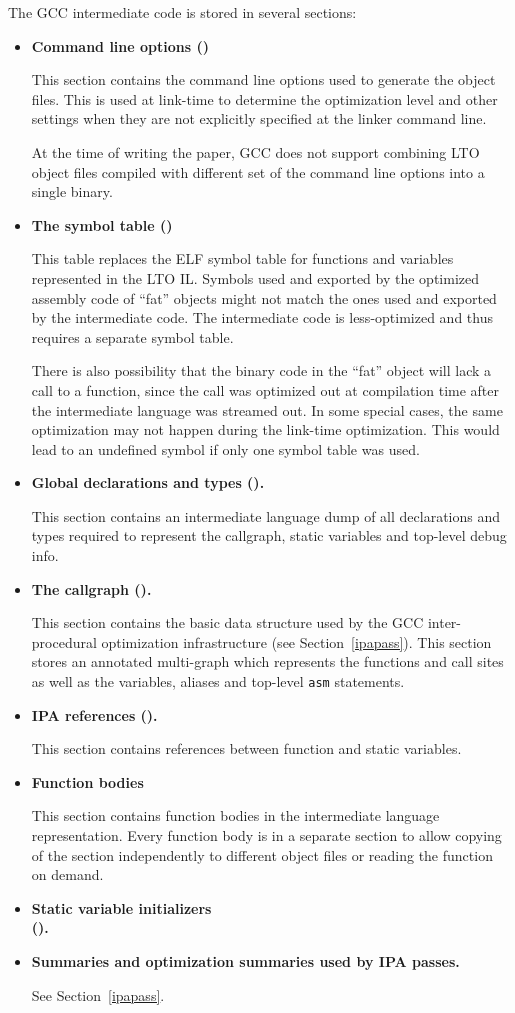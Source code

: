\documentclass[final]{ols}
\begin{document}
The GCC intermediate code is stored in several sections:
\begin{itemize}
 \item {\bf Command line options ()}

 This section
contains the command line options used to generate the object files.  This is
used at link-time to determine the optimization level and other settings when
they are not explicitly specified at the linker command line.

At the time of writing the paper, GCC  does not support combining LTO
object files compiled with different set of the command line options into
a single binary.

\item {\bf The symbol table ()}

This table replaces
the ELF symbol table for functions and variables represented in the LTO IL.
Symbols used and exported by the optimized assembly code of ``fat'' objects
might not match the ones used and exported by the intermediate code.  The
intermediate code is less-optimized and thus requires a separate symbol table.

There is also possibility that the binary code in the ``fat'' object will lack a call to a
function, since the call was optimized out at compilation time after the
intermediate language was streamed out.  In some special cases, the same optimization
may not happen  during the link-time optimization. This would lead to an
undefined symbol if only one symbol table was used.

 \item {\bf Global declarations and types ().}


This section contains an intermediate language dump of all declarations and
types required to represent the callgraph, static variables and top-level debug
info.
 \item {\bf The callgraph ().}

This section contains
the basic data structure used by the GCC inter-procedural optimization
infrastructure (see Section~\ref{ipapass}). This section stores an
annotated multi-graph which represents the functions and call sites as well as the variables, aliases
and top-level {\tt asm} statements.
 \item {\bf IPA references ().}

This section contains references
between function and static variables.
 \item {\bf Function bodies}

This section contains function bodies in the
intermediate language representation. Every function body is in a separate
section to allow copying of the section independently to different object files
or reading the function on demand.
 \item {\bf Static variable initializers\\ ().}
 \item {\bf Summaries and optimization summaries used by IPA passes.}

See Section~\ref{ipapass}.
\end{itemize}
\end{document}
